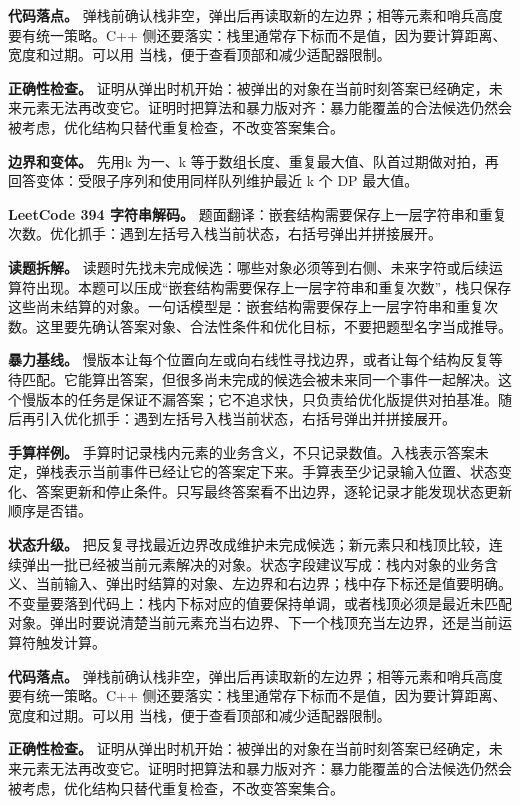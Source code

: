 \textbf{代码落点。} 弹栈前确认栈非空，弹出后再读取新的左边界；相等元素和哨兵高度要有统一策略。C++ 侧还要落实：栈里通常存下标而不是值，因为要计算距离、宽度和过期。可以用  当栈，便于查看顶部和减少适配器限制。

\textbf{正确性检查。} 证明从弹出时机开始：被弹出的对象在当前时刻答案已经确定，未来元素无法再改变它。证明时把算法和暴力版对齐：暴力能覆盖的合法候选仍然会被考虑，优化结构只替代重复检查，不改变答案集合。

\textbf{边界和变体。} 先用k 为一、k 等于数组长度、重复最大值、队首过期做对拍，再回答变体：受限子序列和使用同样队列维护最近 k 个 DP 最大值。

\noindent\textbf{LeetCode 394 字符串解码。} 题面翻译：嵌套结构需要保存上一层字符串和重复次数。优化抓手：遇到左括号入栈当前状态，右括号弹出并拼接展开。

\textbf{读题拆解。} 读题时先找未完成候选：哪些对象必须等到右侧、未来字符或后续运算符出现。本题可以压成“嵌套结构需要保存上一层字符串和重复次数”，栈只保存这些尚未结算的对象。一句话模型是：嵌套结构需要保存上一层字符串和重复次数。这里要先确认答案对象、合法性条件和优化目标，不要把题型名字当成推导。

\textbf{暴力基线。} 慢版本让每个位置向左或向右线性寻找边界，或者让每个结构反复等待匹配。它能算出答案，但很多尚未完成的候选会被未来同一个事件一起解决。这个慢版本的任务是保证不漏答案；它不追求快，只负责给优化版提供对拍基准。随后再引入优化抓手：遇到左括号入栈当前状态，右括号弹出并拼接展开。

\textbf{手算样例。} 手算时记录栈内元素的业务含义，不只记录数值。入栈表示答案未定，弹栈表示当前事件已经让它的答案定下来。手算表至少记录输入位置、状态变化、答案更新和停止条件。只写最终答案看不出边界，逐轮记录才能发现状态更新顺序是否错。

\textbf{状态升级。} 把反复寻找最近边界改成维护未完成候选；新元素只和栈顶比较，连续弹出一批已经被当前元素解决的对象。状态字段建议写成：栈内对象的业务含义、当前输入、弹出时结算的对象、左边界和右边界；栈中存下标还是值要明确。不变量要落到代码上：栈内下标对应的值要保持单调，或者栈顶必须是最近未匹配对象。弹出时要说清楚当前元素充当右边界、下一个栈顶充当左边界，还是当前运算符触发计算。

\textbf{代码落点。} 弹栈前确认栈非空，弹出后再读取新的左边界；相等元素和哨兵高度要有统一策略。C++ 侧还要落实：栈里通常存下标而不是值，因为要计算距离、宽度和过期。可以用  当栈，便于查看顶部和减少适配器限制。

\textbf{正确性检查。} 证明从弹出时机开始：被弹出的对象在当前时刻答案已经确定，未来元素无法再改变它。证明时把算法和暴力版对齐：暴力能覆盖的合法候选仍然会被考虑，优化结构只替代重复检查，不改变答案集合。

